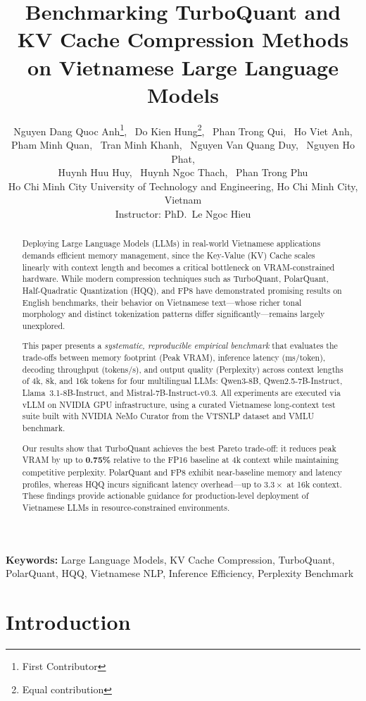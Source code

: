 \documentclass[10pt,twocolumn]{article}
\title{
  \textbf{Benchmarking TurboQuant and KV Cache Compression Methods
  on Vietnamese Large Language Models}
}
\author{
  Nguyen Dang Quoc Anh\thanks{First Contributor},~
  Do Kien Hung\thanks{Equal contribution},~
  Phan Trong Qui\footnotemark[2],~
  Ho Viet Anh\footnotemark[2],\\
  Pham Minh Quan\footnotemark[2],~
  Tran Minh Khanh\footnotemark[2],~
  Nguyen Van Quang Duy\footnotemark[2],~
  Nguyen Ho Phat\footnotemark[2],\\
  Huynh Huu Huy\footnotemark[2],~
  Huynh Ngoc Thach\footnotemark[2],~
  Phan Trong Phu\footnotemark[2]
  \\[4pt]
  \small
  Ho Chi Minh City University of Technology and Engineering,
  Ho Chi Minh City, Vietnam\\[2pt]
  \small
  Instructor: PhD.~Le Ngoc Hieu
}
\date{}
\begin{document}
\maketitle



\begin{abstract}
Deploying Large Language Models (LLMs) in real-world Vietnamese applications
demands efficient memory management, since the Key-Value (KV) Cache
scales linearly with context length and becomes a critical bottleneck
on VRAM-constrained hardware.
While modern compression techniques such as TurboQuant, PolarQuant,
Half-Quadratic Quantization (HQQ), and FP8 have demonstrated promising
results on English benchmarks, their behavior on Vietnamese text---whose
richer tonal morphology and distinct tokenization patterns differ
significantly---remains largely unexplored.

This paper presents a \emph{systematic, reproducible empirical benchmark}
that evaluates the trade-offs between memory footprint (Peak VRAM),
inference latency (ms/token), decoding throughput (tokens/s),
and output quality (Perplexity) across context lengths of 4k, 8k, and 16k tokens
for four multilingual LLMs: Qwen3-8B, Qwen2.5-7B-Instruct, Llama~3.1-8B-Instruct,
and Mistral-7B-Instruct-v0.3.
All experiments are executed via vLLM on NVIDIA GPU infrastructure,
using a curated Vietnamese long-context test suite built with
NVIDIA NeMo Curator from the VTSNLP dataset and VMLU benchmark.

Our results show that TurboQuant achieves the best Pareto trade-off:
it reduces peak VRAM by up to \textbf{0.75\%} relative to the FP16 baseline
at 4k context while maintaining competitive perplexity.
PolarQuant and FP8 exhibit near-baseline memory and latency profiles,
whereas HQQ incurs significant latency overhead---up to $3.3\times$ at 16k context.
These findings provide actionable guidance for production-level deployment
of Vietnamese LLMs in resource-constrained environments.
\end{abstract}


\textbf{Keywords:}
Large Language Models,
KV Cache Compression,
TurboQuant,
PolarQuant,
HQQ,
Vietnamese NLP,
Inference Efficiency,
Perplexity Benchmark



\section{Introduction}
\end{document}
